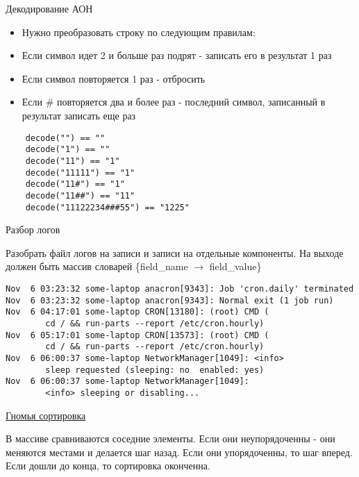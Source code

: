 \documentclass{article}
\begin{document}
\begin{center} Декодирование АОН \end{center}
\begin{itemize}
    \item Нужно преобразовать строку по следующим правилам:
    \item Если символ идет 2 и больше раз подрят - записать его в результат 1 раз
    \item Если символ повторяется 1 раз - отбросить
    \item Если \# повторяется два и более раз - последний символ, записанный в результат записать еще раз
\end{itemize}
\begin{lstlisting}
    decode("") == ""
    decode("1") == ""
    decode("11") == "1"
    decode("11111") == "1"
    decode("11#") == "1"
    decode("11##") == "11"
    decode("11122234###55") == "1225"
\end{lstlisting}
\newpage

\begin{center} Разбор логов \end{center}
Разобрать файл логов на записи и записи на отдельные компоненты.
На выходе должен быть массив словарей \{field\_name $\rightarrow$ field\_value\}
\begin{Large}
\begin{lstlisting}
Nov  6 03:23:32 some-laptop anacron[9343]: Job 'cron.daily' terminated
Nov  6 03:23:32 some-laptop anacron[9343]: Normal exit (1 job run)
Nov  6 04:17:01 some-laptop CRON[13180]: (root) CMD (   
        cd / && run-parts --report /etc/cron.hourly)
Nov  6 05:17:01 some-laptop CRON[13573]: (root) CMD (   
        cd / && run-parts --report /etc/cron.hourly)
Nov  6 06:00:37 some-laptop NetworkManager[1049]: <info> 
        sleep requested (sleeping: no  enabled: yes)
Nov  6 06:00:37 some-laptop NetworkManager[1049]: 
        <info> sleeping or disabling...
\end{lstlisting}
\end{Large}
\newpage

\begin{center}
\href{http://ru.wikipedia.org/wiki/%D0%93%D0%BD%D0%BE%D0%BC%D1%8C%D1%8F_%D1%81%D0%BE%D1%80%D1%82%D0%B8%D1%80%D0%BE%D0%B2%D0%BA%D0%B0}{Гномья сортировка}
\end{center}
В массиве сравниваются соседние элементы. 
Если они неупорядоченны - они меняются местами и делается шаг назад.
Если они упорядоченны, то шаг вперед. 
Если дошли до конца, то сортировка оконченна.
\newpage
\end{document}
